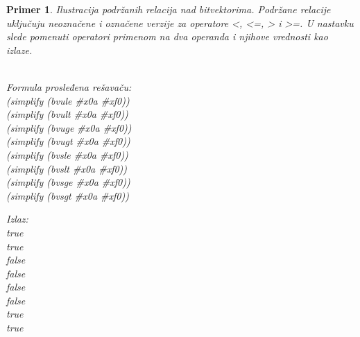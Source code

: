 \documentclass[12pt,oneside]{memoir}
\newtheorem{primer}{Primer}
\begin{document}
\begin{primer} Ilustracija podržanih relacija nad bitvektorima. Podržane relacije uključuju neoznačene i označene verzije za operatore <, <=, > i >=. U nastavku slede pomenuti operatori primenom na dva operanda i njihove vrednosti kao izlaze.
\\ \\ 
\begin{minipage}[b]{0.5\textwidth}
Formula prosleđena rešavaču:
\\(simplify (bvule \#x0a \#xf0))  
\\(simplify (bvult \#x0a \#xf0))  
\\(simplify (bvuge \#x0a \#xf0))  
\\(simplify (bvugt \#x0a \#xf0))  
\\(simplify (bvsle \#x0a \#xf0)) 
\\(simplify (bvslt \#x0a \#xf0))  
\\(simplify (bvsge \#x0a \#xf0))  
\\(simplify (bvsgt \#x0a \#xf0))

\end{minipage}
\hspace{2cm} 
\begin{minipage}[t]{0.5\textwidth}
\vspace{-5.25cm}
Izlaz:
\\true 
\\true 
\\false 
\\false 
\\false 
\\false 
\\true 
\\true
\end{minipage}


\end{primer}
\end{document}
